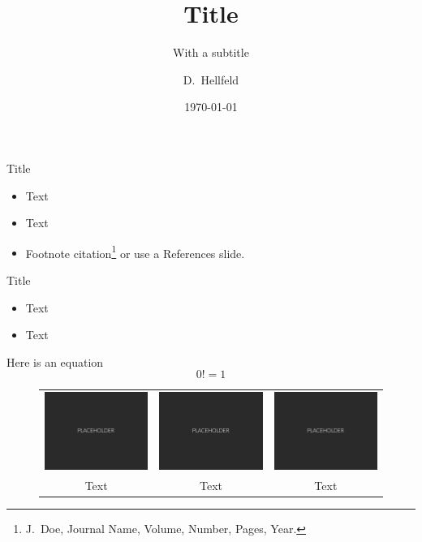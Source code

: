 \documentclass[xcolor=x11names,compress]{beamer}
\title[Short title]{Title}
\subtitle{With a subtitle}
\author{D.~Hellfeld}
\institute[Affiliation]{Affiliation \\ Department}
\date{\today}
\begin{document}
\begin{frame}
\maketitle
\end{frame}


\begin{frame}{Title}

\begin{itemize}
	\item Text
	\item Text
	\item Footnote citation\footnote{J.~Doe, Journal Name, Volume, Number, Pages, Year.} or use a References slide.
\end{itemize}

\end{frame}


\begin{frame}{Title}

\begin{itemize}
	\item Text
	\item Text
\end{itemize}

Here is an equation
%
\begin{equation}
0! = 1
\end{equation}

\begin{figure}
\begin{tabular}{ccc}
\includegraphics[height=1in]{Figures/Placeholder.png} &
\includegraphics[height=1in]{Figures/Placeholder.png} &
\includegraphics[height=1in]{Figures/Placeholder.png} \\
\footnotesize{Text} & \footnotesize{Text} & \footnotesize{Text}
\end{tabular}
\end{figure}

\end{frame}
\end{document}
